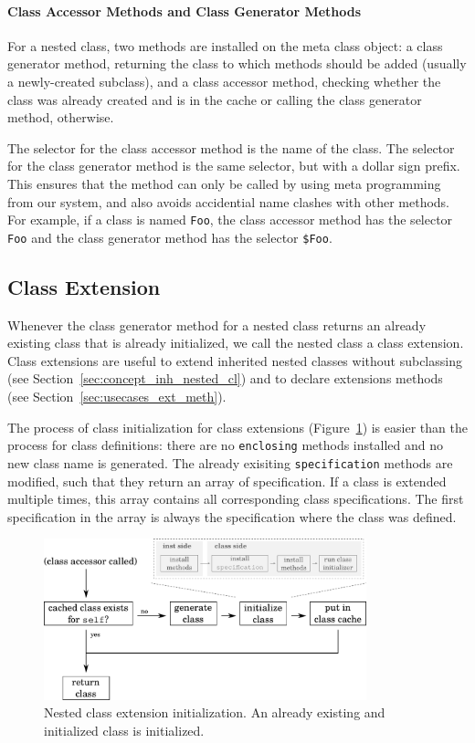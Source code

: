 \paragraph{Class Accessor Methods and Class Generator Methods}
For a nested class, two methods are installed on the meta class object: a class generator method, returning the class to which methods should be added (usually a newly-created subclass), and a class accessor method, checking whether the class was already created and is in the cache or calling the class generator method, otherwise.

The selector for the class accessor method is the name of the class. The selector for the class generator method is the same selector, but with a dollar sign prefix. This ensures that the method can only be called by using meta programming from our system, and also avoids accidential name clashes with other methods. For example, if a class is named \texttt{Foo}, the class accessor method has the selector \texttt{Foo} and the class generator method has the selector \texttt{\$Foo}.

\subsection{Class Extension}
\label{sec:impl_class_ext_subsec}
Whenever the class generator method for a nested class returns an already existing class that is already initialized, we call the nested class a class extension. Class extensions are useful to extend inherited nested classes without subclassing (see Section~\ref{sec:concept_inh_nested_cl}) and to declare extensions methods (see Section~\ref{sec:usecases_ext_meth}). 

The process of class initialization for class extensions (Figure~\ref{fig:lazy_class_gen_ext}) is easier than the process for class definitions: there are no \texttt{enclosing} methods installed and no new class name is generated. The already exisiting \texttt{specification} methods are modified, such that they return an array of specification. If a class is extended multiple times, this array contains all corresponding class specifications. The first specification in the array is always the specification where the class was defined.

\begin{figure}[!htp]
	\includegraphics[width=0.8314\textwidth]{lazy_class_gen_ext.pdf}
	\centering
	\caption[Nested class extension initialization]{Nested class extension initialization. An already existing and initialized class is initialized.}
	\label{fig:lazy_class_gen_ext}
\end{figure}

